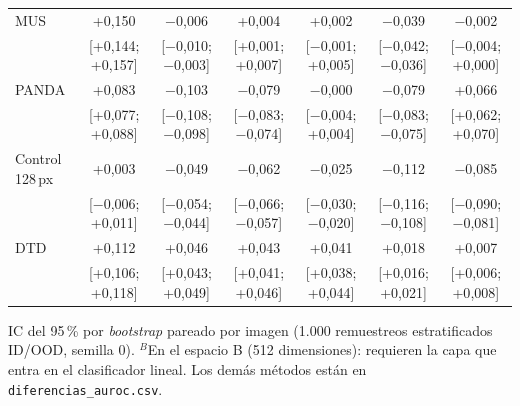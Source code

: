 \begin{table}
\begin{tabular*}{\linewidth}{@{\extracolsep{\fill}}lcccccc}
MUS & +0{,}150 & $-$0{,}006 & +0{,}004 & +0{,}002 & $-$0{,}039 & $-$0{,}002 \\
& {\scriptsize [+0{,}144; +0{,}157]} & {\scriptsize [$-$0{,}010; $-$0{,}003]} & {\scriptsize [+0{,}001; +0{,}007]} & {\scriptsize [$-$0{,}001; +0{,}005]} & {\scriptsize [$-$0{,}042; $-$0{,}036]} & {\scriptsize [$-$0{,}004; +0{,}000]} \\[2pt]
PANDA & +0{,}083 & $-$0{,}103 & $-$0{,}079 & $-$0{,}000 & $-$0{,}079 & +0{,}066 \\
& {\scriptsize [+0{,}077; +0{,}088]} & {\scriptsize [$-$0{,}108; $-$0{,}098]} & {\scriptsize [$-$0{,}083; $-$0{,}074]} & {\scriptsize [$-$0{,}004; +0{,}004]} & {\scriptsize [$-$0{,}083; $-$0{,}075]} & {\scriptsize [+0{,}062; +0{,}070]} \\[2pt]
Control 128\,px & +0{,}003 & $-$0{,}049 & $-$0{,}062 & $-$0{,}025 & $-$0{,}112 & $-$0{,}085 \\
& {\scriptsize [$-$0{,}006; +0{,}011]} & {\scriptsize [$-$0{,}054; $-$0{,}044]} & {\scriptsize [$-$0{,}066; $-$0{,}057]} & {\scriptsize [$-$0{,}030; $-$0{,}020]} & {\scriptsize [$-$0{,}116; $-$0{,}108]} & {\scriptsize [$-$0{,}090; $-$0{,}081]} \\[2pt]
DTD & +0{,}112 & +0{,}046 & +0{,}043 & +0{,}041 & +0{,}018 & +0{,}007 \\
& {\scriptsize [+0{,}106; +0{,}118]} & {\scriptsize [+0{,}043; +0{,}049]} & {\scriptsize [+0{,}041; +0{,}046]} & {\scriptsize [+0{,}038; +0{,}044]} & {\scriptsize [+0{,}016; +0{,}021]} & {\scriptsize [+0{,}006; +0{,}008]} \\[2pt]
\bottomrule
\end{tabular*}

\smallskip
\parbox{\linewidth}{\scriptsize IC del 95\,\% por \emph{bootstrap} pareado por imagen (1.000 remuestreos estratificados ID/OOD, semilla 0). $^{B}$En el espacio B (512 dimensiones): requieren la capa que entra en el clasificador lineal. Los demás métodos están en \texttt{diferencias\_auroc.csv}.}
\end{table}

